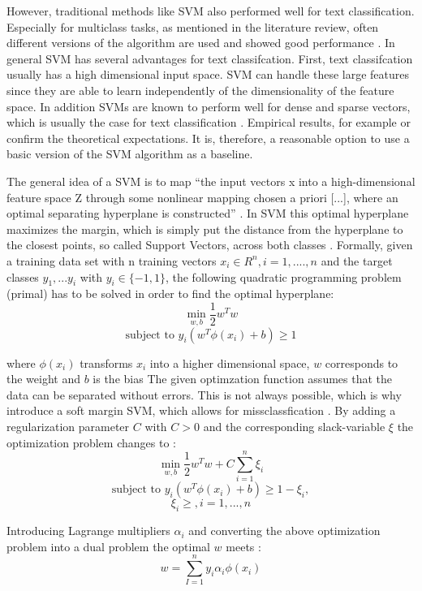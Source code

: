 \documentclass[12pt, a4paper, titlepage]{article}
\begin{document}
However, traditional methods like \ac{SVM} also performed well for text classification. Especially for multiclass tasks, as mentioned in the literature review, often different versions of the algorithm are used and showed good performance \citep{Aiolli2005,Angulo2003,Benabdeslem2006,Guo2015,Mayoraz1999,Tang2019,Tomar2015}. In general \ac{SVM} has several advantages for text classifcation. First, text classifcation usually has a high dimensional input space. \ac{SVM} can handle these large features since they are able to learn independently of the dimensionality of the feature space. In addition \ac{SVM}s are known to perform well for dense and sparse vectors, which is usually the case for text classification \citep{Joachims1998}. Empirical results, for example \citet{Joachims1998} or \cite{Liu2010} confirm the theoretical expectations. It is, therefore, a reasonable option to use a basic version of the \ac{SVM} algorithm as a baseline.

The general idea of a \ac{SVM} is to map ``the input vectors x into a high-dimensional feature space Z through some nonlinear mapping chosen a priori [...], where an optimal separating hyperplane is constructed'' \citep[138]{Vapnik2000}. In \ac{SVM} this optimal hyperplane maximizes the margin, which is simply put the distance from the hyperplane to the closest points, so called Support Vectors, across both classes \citep{Han2012}. Formally, given a training data set with n training vectors $x_i \in R^n, i = 1,....,n$ and the target classes $y_1,...y_i$ with $y_i \in \{-1, 1\}$, the following quadratic programming problem (primal) has to be solved in order to find the optimal hyperplane:
\[\min_{w,b} \frac{1}{2}w^{T}w \] 
\[\text{subject to } y_i(w^T\phi(x_i)+b) \geq 1\]

where $\phi(x_i)$ transforms $x_i$ into a higher dimensional space, $w$ corresponds to the weight and $b$ is the bias \citep{Chang2001,Jordan2006}
The given optimzation function assumes that the data can be separated without errors. This is not always possible, which is why \cite{Cortes1995} introduce a soft margin \ac{SVM}, which allows for missclassfication \citep{Vapnik2000}.
By adding a regularization parameter $C$ with $C > 0$ and the corresponding slack-variable $\xi$ the optimization problem changes to \citep{Chang2001, Han2012}: 
\[\min_{w,b} \frac{1}{2}w^{T}w + C \sum_{i=1}^n \xi_i \] 
\[\text{subject to } y_i(w^T\phi(x_i)+b) \geq 1 - \xi_i, \] 
\[\xi_i \geq, i = 1,...,n\]

Introducing Lagrange multipliers $\alpha_i$ and converting the above optimization problem into a dual problem the optimal $w$ meets \citep{Chang2001, Jordan2006}:
\[w = \sum_{I=1}^n y_i\alpha_i\phi(x_i)\]
\end{document}
